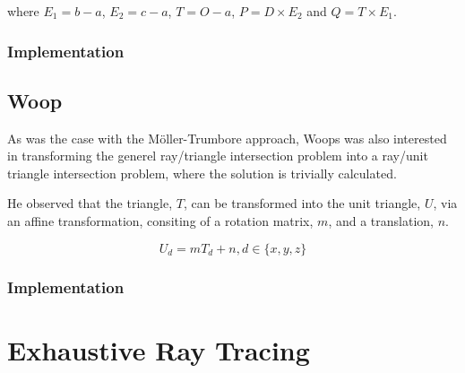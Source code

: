 where $E_1 = b - a$, $E_2 = c - a$, $T = O - a$, $P = D \times  E_2$
and $Q = T \times  E_1$.

\subsubsection{Implementation}


\subsection{Woop}


As was the case with the Möller-Trumbore approach, Woops was also
interested in transforming the generel ray/triangle intersection
problem into a ray/unit triangle intersection problem, where the
solution is trivially calculated.

He observed that the triangle, $T$, can be transformed into the unit
triangle, $U$, via an affine transformation, consiting of a rotation
matrix, $m$, and a translation, $n$.

\begin{displaymath}
  U_d = m T_d + n, d \in \{x, y, z\}
\end{displaymath}



\subsubsection{Implementation}





\section{Exhaustive Ray Tracing}

